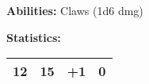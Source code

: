 \begin{multicols}{2}
\textbf{Abilities:} Claws (1d6 dmg)

\textbf{Statistics:}

\begin{center}
{
\begin{xtabular}{|l|l|l|l|}
12 & 15 & +1 & 0 \\
\hline
\end{xtabular}
}
\end{center}

\end{multicols}
